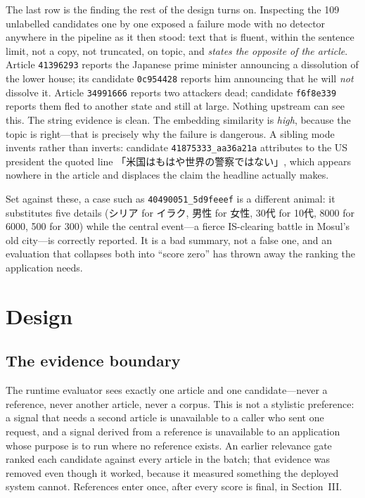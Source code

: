 \documentclass[conference]{IEEEtran}
\begin{document}
The last row is the finding the rest of the design turns on. Inspecting
the 109 unlabelled candidates one by one exposed a failure mode with no
detector anywhere in the pipeline as it then stood: text that is fluent,
within the sentence limit, not a copy, not truncated, on topic, and
\emph{states the opposite of the article}. Article \texttt{41396293}
reports the Japanese prime minister announcing a dissolution of the
lower house; its candidate \texttt{0c954428} reports him announcing that
he will \emph{not} dissolve it. Article \texttt{34991666} reports two
attackers dead; candidate \texttt{f6f8e339} reports them fled to another
state and still at large. Nothing upstream can see this. The string
evidence is clean. The embedding similarity is \emph{high}, because the
topic is right---that is precisely why the failure is dangerous. A
sibling mode invents rather than inverts: candidate
\texttt{41875333\_aa36a21a} attributes to the US president the quoted
line 「米国はもはや世界の警察ではない」, which appears nowhere in the
article and displaces the claim the headline actually makes.

Set against these, a case such as \texttt{40490051\_5d9feeef} is a
different animal: it substitutes five details (シリア for イラク,
男性 for 女性, 30代 for 10代, 8000 for 6000, 500 for 300) while the
central event---a fierce IS-clearing battle in Mosul's old city---is
correctly reported. It is a bad summary, not a false one, and an
evaluation that collapses both into ``score zero'' has thrown away the
ranking the application needs.

\section{Design}

\subsection{The evidence boundary}
The runtime evaluator sees exactly one article and one candidate---never
a reference, never another article, never a corpus. This is not a
stylistic preference: a signal that needs a second article is
unavailable to a caller who sent one request, and a signal derived from
a reference is unavailable to an application whose purpose is to run
where no reference exists. An earlier relevance gate ranked each
candidate against every article in the batch; that evidence was removed
even though it worked, because it measured something the deployed system
cannot. References enter once, after every score is final, in
Section~III.
\end{document}
